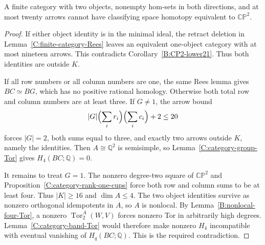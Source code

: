 \begin{theorem}
\label{C:twenty-strongly-connected}
A finite category with two objects, nonempty hom-sets in both
directions, and at most twenty arrows cannot have classifying
space homotopy equivalent to $\mathbb{CP}^2$.
\end{theorem}
\begin{proof}
If either object identity is in the minimal ideal, the retract
deletion in Lemma~\ref{C:finite-category-Rees} leaves an
equivalent one-object category with at most nineteen arrows.
This contradicts Corollary~\ref{B:CP2-lower21}.  Thus both
identities are outside $K$.

If all row numbers or all column numbers are one, the same
Rees lemma gives $BC\simeq BG$, which has no positive rational
homology.  Otherwise both total row and column numbers are at
least three.  If $G\ne1$, the arrow bound
\[
 |G|\Bigl(\sum_i r_i\Bigr)\Bigl(\sum_i c_i\Bigr)+2\leq20
\]
forces $|G|=2$, both sums equal to three, and exactly two arrows
outside $K$, namely the identities.  Then $A\cong\mathbb Q^2$
is semisimple, so Lemma~\ref{C:category-group-Tor} gives
$H_4(BC;\mathbb Q)=0$.

It remains to treat $G=1$.  The nonzero degree-two square of
$\mathbb{CP}^2$ and Proposition~\ref{C:category-rank-one-cups}
force both row and column sums to be at least four.  Thus
$|K|\geq16$ and $\dim A\leq4$.  The two object identities
survive as nonzero orthogonal idempotents in $A$, so $A$ is
nonlocal.  By Lemma~\ref{B:nonlocal-four-Tor}, a nonzero
$\operatorname{Tor}_2^A(W,V)$ forces nonzero Tor in arbitrarily
high degrees.  Lemma~\ref{C:category-band-Tor} would therefore
make nonzero $H_4$ incompatible with eventual vanishing of
$H_q(BC;\mathbb Q)$.  This is the required contradiction.
\end{proof}

